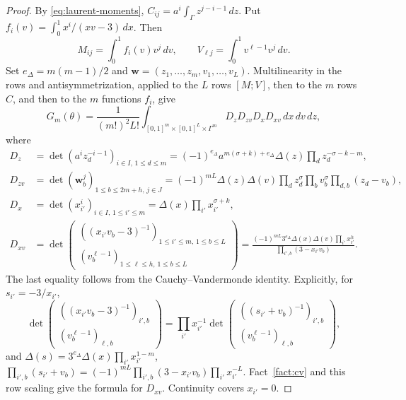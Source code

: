 \documentclass{amsart}
\numberwithin{equation}{section}
\numberwithin{table}{section}
\begin{document}
\begin{proof}
By \eqref{eq:laurent-moments},
$C_{ij}=a^i\int_\Gamma z^{j-i-1}\,dz$.
Put $f_i(v)=\int_0^1x^i/(xv-3)\,dx$. Then
\[
M_{ij}=\int_0^1f_i(v)v^j\,dv,\qquad
V_{\ell j}=\int_0^1v^{\ell-1}v^j\,dv.
\]
Set $e_\Delta=m(m-1)/2$ and
$\mathbf w=(z_1,\ldots,z_m,v_1,\ldots,v_L)$.
Multilinearity in the rows and antisymmetrization, applied to the $L$ rows
$[M;V]$, then to the $m$ rows $C$, and then to the $m$ functions $f_i$, give
\begin{equation*}
G_m(\theta)=\frac1{(m!)^2L!}
\int_{[0,1]^m\times[0,1]^L\times\Gamma^m}
D_zD_{zv}D_xD_{xv}\,dx\,dv\,dz,
\end{equation*}
where
\begin{align*}
D_z&=\det(a^iz_d^{-i-1})_{i\in I,\,1\le d\le m}
 =(-1)^{e_\Delta}a^{m(\sigma+k)+e_\Delta}\Delta(z)\prod_dz_d^{-\sigma-k-m},\\
D_{zv}&=\det(\mathbf w_b^j)_{1\le b\le 2m+h,\,j\in J}
=(-1)^{mL}\Delta(z)\Delta(v)
  \prod_dz_d^\sigma\prod_bv_b^\sigma\prod_{d,b}(z_d-v_b),\\
D_x&=\det(x_{i'}^i)_{i\in I,\,1\le i'\le m}
 =\Delta(x)\prod_{i'}x_{i'}^{\sigma+k},\\
D_{xv}&=\det\begin{pmatrix}
((x_{i'}v_b-3)^{-1})_{1\le i'\le m,\,1\le b\le L}\\
(v_b^{\ell-1})_{1\le\ell\le h,\,1\le b\le L}
\end{pmatrix}
 =\frac{(-1)^{mL}3^{e_\Delta}\Delta(x)\Delta(v)\prod_{i'}x_{i'}^h}
{\prod_{i',b}(3-x_{i'}v_b)}.
\end{align*}
The last equality follows from the Cauchy--Vandermonde identity. Explicitly,
for $s_{i'}=-3/x_{i'}$,
\[
\det\begin{pmatrix}((x_{i'}v_b-3)^{-1})_{i',b}\\(v_b^{\ell-1})_{\ell,b}\end{pmatrix}
=\prod_{i'}x_{i'}^{-1}
\det\begin{pmatrix}((s_{i'}+v_b)^{-1})_{i',b}\\(v_b^{\ell-1})_{\ell,b}\end{pmatrix},
\]
and $\Delta(s)=3^{e_\Delta}\Delta(x)\prod_{i'}x_{i'}^{1-m}$,
$\prod_{i',b}(s_{i'}+v_b)=(-1)^{mL}\prod_{i',b}(3-x_{i'}v_b)\prod_{i'}x_{i'}^{-L}$.
Fact~\ref{fact:cv} and this row scaling give the formula for $D_{xv}$.
Continuity covers $x_{i'}=0$.


\end{proof}
\end{document}
